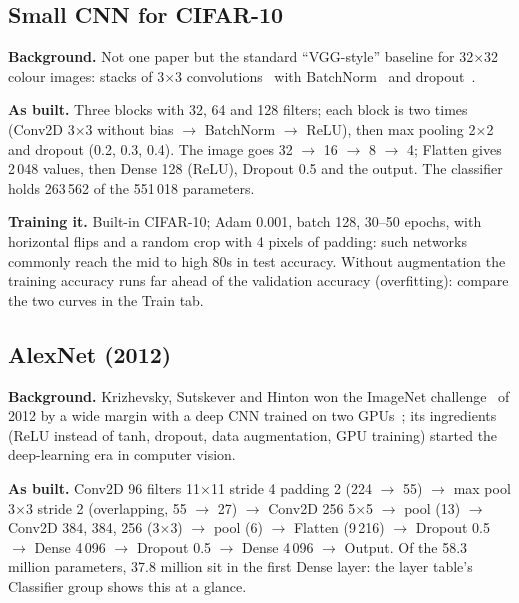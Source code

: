 \documentclass[11pt,a4paper]{article}
\begin{document}
\subsection{Small CNN for CIFAR-10}
\textbf{Background.} Not one paper but the standard ``VGG-style'' baseline for 32$\times$32 colour images: stacks of 3$\times$3
convolutions~\cite{simonyan2014vgg} with BatchNorm~\cite{ioffe2015batchnorm} and dropout~\cite{srivastava2014dropout}.

\textbf{As built.} Three blocks with 32, 64 and 128 filters; each block is two times (Conv2D 3$\times$3 without bias $\rightarrow$
BatchNorm $\rightarrow$ ReLU), then max pooling 2$\times$2 and dropout (0.2, 0.3, 0.4). The image goes 32 $\rightarrow$ 16 $\rightarrow$ 8
$\rightarrow$ 4; Flatten gives 2\,048 values, then Dense 128 (ReLU), Dropout 0.5 and the output. The classifier holds 263\,562 of the
551\,018 parameters.

\textbf{Training it.} Built-in CIFAR-10; Adam 0.001, batch 128, 30--50 epochs, with horizontal flips and a random crop with 4 pixels of
padding: such networks commonly reach the mid to high 80s in test accuracy. Without augmentation the training accuracy runs far ahead of
the validation accuracy (overfitting): compare the two curves in the Train tab.

\subsection{AlexNet (2012)}
\textbf{Background.} Krizhevsky, Sutskever and Hinton won the ImageNet challenge~\cite{russakovsky2014imagenet} of 2012 by a wide margin
with a deep CNN trained on two GPUs~\cite{krizhevsky2012alexnet}; its ingredients (ReLU instead of tanh, dropout, data augmentation, GPU
training) started the deep-learning era in computer vision.

\textbf{As built.} Conv2D 96 filters 11$\times$11 stride 4 padding 2 (224 $\rightarrow$ 55) $\rightarrow$ max pool 3$\times$3 stride 2
(overlapping, 55 $\rightarrow$ 27) $\rightarrow$ Conv2D 256 5$\times$5 $\rightarrow$ pool (13) $\rightarrow$ Conv2D 384, 384, 256
(3$\times$3) $\rightarrow$ pool (6) $\rightarrow$ Flatten (9\,216) $\rightarrow$ Dropout 0.5 $\rightarrow$ Dense 4\,096 $\rightarrow$
Dropout 0.5 $\rightarrow$ Dense 4\,096 $\rightarrow$ Output. Of the 58.3 million parameters, 37.8 million sit in the first Dense layer: the
layer table's Classifier group shows this at a glance.
\end{document}
